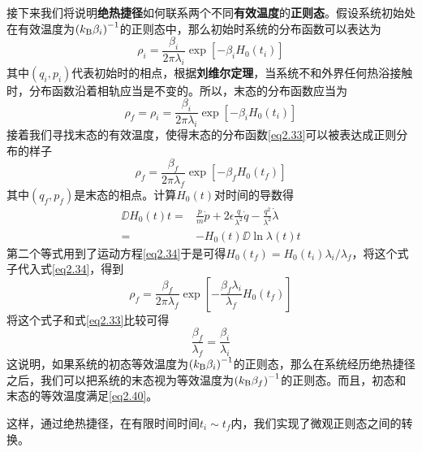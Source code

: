 接下来我们将说明\textbf{绝热捷径}如何联系两个不同\textbf{有效温度}的\textbf{正则态}。\cite{Tu2013}假设系统初始处在有效温度为$\left(k_{\mathrm{B}} \beta_i\right)^{-1}$的正则态中，那么初始时系统的分布函数可以表达为
\begin{equation}
    \rho_{i}=\frac{\beta_{i}}{2 \pi \lambda_{i}} \exp \left[-\beta_{i} H_0 \left(t_{i}\right)\right]
    \label{eq2.32}
\end{equation}
其中$(q_i, p_i)$代表初始时的相点，根据\textbf{刘维尔定理}，当系统不和外界任何热浴接触时，分布函数沿着相轨应当是不变的。所以，末态的分布函数应当为
\begin{equation}
    \rho_{f}=\rho_{i}=\frac{\beta_{i} }{2 \pi \lambda_{i}} \exp \left[-\beta_{i} H_0 \left(t_{i}\right)\right]
    \label{eq2.33}
\end{equation}
接着我们寻找末态的有效温度，使得末态的分布函数\eqref{eq2.33}可以被表达成正则分布的样子
\begin{equation}
    \rho_{f}=\frac{\beta_{f} }{2 \pi \lambda_{f}} \exp \left[-\beta_{f} H_0 \left(t_{f}\right)\right]
    \label{eq2.34}
\end{equation}
其中$(q_f, p_f)$是末态的相点。计算$H_0 (t)$对时间的导数得
\begin{equation}
    \begin{split}
        \DD{H_0 (t)}{t} =& \frac{p}{m}\dot{p} + 2 \epsilon \frac{q}{\lambda^2}\dot{q} - \frac{q^2}{\lambda^2} \dot{\lambda}\\
                        =& -H_0 (t) \DD{\ln{\lambda(t)}}{t}
    \end{split}
    \label{eq2.35}
\end{equation}
第二个等式用到了运动方程\eqref{eq2.34}于是可得$H_0 \left(t_{f}\right)=H_0 \left(t_{i}\right) \lambda_{i} / \lambda_{f}$，将这个式子代入式\eqref{eq2.34}，得到
\begin{equation}
    \rho_{f}=\frac{\beta_{f} }{2 \pi \lambda_{f}} \exp \left[-\frac{\beta_{f} \lambda_i}{\lambda_f} H_0 \left(t_{f}\right)\right]
    \label{eq2.36}
\end{equation}
将这个式子和式\eqref{eq2.33}比较可得
\begin{equation}
    \frac{\beta_f}{\lambda_f} = \frac{\beta_i}{\lambda_i}
    \label{eq2.40}
\end{equation}
这说明，如果系统的初态等效温度为$\left( k_{\mathrm{B}} \beta_i\right)^{-1}$的正则态，那么在系统经历绝热捷径之后，我们可以把系统的末态视为等效温度为$\left( k_{\mathrm{B}} \beta_f\right)^{-1}$的正则态。而且，初态和末态的等效温度满足\eqref{eq2.40}。

这样，通过绝热捷径，在有限时间时间$t_i \sim t_f$内，我们实现了微观正则态之间的转换。


